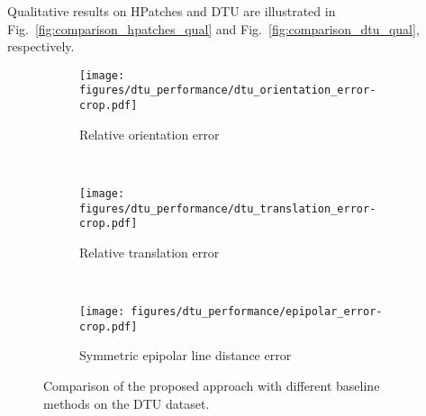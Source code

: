 \documentclass[10pt,twocolumn,letterpaper]{article}
\begin{document}
\begin{table}[t!]
\begin{center}
\end{center}
\vspace{-2mm}
\caption{Normalized Jaccard index (higher is better) produced by the~\texttt{DGC+M-Net} model on HPatches evaluation dataset with different types of synthetic transformations of () training dataset.}\label{tbl:jaccard_hpatches}
\end{table}

Qualitative results on HPatches and DTU are illustrated in Fig.~\ref{fig:comparison_hpatches_qual} and Fig.~\ref{fig:comparison_dtu_qual}, respectively.

\begin{figure*}[t!]
 	\centering
 	\begin{subfigure}[t]{.3\textwidth}
 		\centering
 		\texttt{[image: figures/dtu\_performance/dtu\_orientation\_error-crop.pdf]}
 		\caption{Relative orientation error}\label{fig:relative_pose_dtu_orient}
 	\end{subfigure}~
 	\begin{subfigure}[t]{.3\textwidth}
 		\centering
 		\texttt{[image: figures/dtu\_performance/dtu\_translation\_error-crop.pdf]}
 		\caption{Relative translation error}\label{fig:relative_pose_dtu_transl}
 	\end{subfigure}~
 	\begin{subfigure}[t]{.3\textwidth}
 		\centering
 		\texttt{[image: figures/dtu\_performance/epipolar\_error-crop.pdf]}
 		\caption{Symmetric epipolar line distance error}\label{fig:f_epipolar_error}
 	\end{subfigure}
\caption{Comparison of the proposed approach with different baseline methods on the DTU dataset.}\label{fig:relative_pose_dtu}
\end{figure*}
\end{document}
